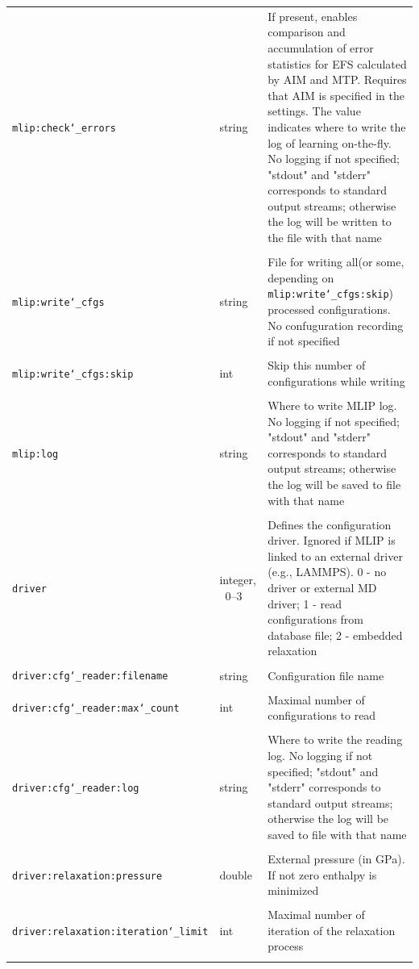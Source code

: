 \documentclass[12pt]{article}
\renewcommand{\_}{\char`_}
\begin{document}
{\begin{longtable}{| p{\largestoption} | p{3.5em} | p{\descriptionlength} |}
		\texttt{mlip:check\_errors}	& string &	If present, enables comparison and accumulation of error statistics for EFS calculated by AIM and MTP. Requires that AIM is specified in the settings. The value indicates where to write the log of learning on-the-fly. No logging if not specified; "stdout" and "stderr" corresponds to standard output streams; otherwise the log will be written to the file with that name \\
&&\\
		\texttt{mlip:write\_cfgs}& string &	File for writing all(or some, depending on \texttt{mlip:write\_cfgs:skip}) processed configurations. No confuguration recording if not specified\\
&&\\
		\texttt{mlip:write\_cfgs:skip}& int &		Skip this number of configurations while writing\\
&&\\
		\texttt{mlip:log}	&string&	Where to write MLIP log. No logging if not specified; "stdout" and "stderr" corresponds to standard output streams; otherwise the log will be saved to file with that name\\
		\hline
&&\\
		\texttt{driver}	& integer, ~0--3 &		Defines the configuration driver. Ignored if MLIP is linked to an external driver (e.g., LAMMPS). 0 - no driver or external MD driver; 1 - read configurations from database file; 2 - embedded relaxation\\
&&\\
		\texttt{driver:cfg\_reader:filename}&string&	Configuration file name\\ 
&&\\
		\texttt{driver:cfg\_reader:max\_count}	&int&		Maximal number of configurations to read\\
&&\\
		\texttt{driver:cfg\_reader:log}&string&	Where to write the reading log. No logging if not specified; "stdout" and "stderr" corresponds to standard output streams; otherwise the log will be saved to file with that name\\
&&\\
		\texttt{driver:relaxation:pressure}	&double&	External pressure (in GPa). If not zero enthalpy is minimized\\
&&\\
		\texttt{driver:relaxation:iteration\_limit}	&int&		Maximal number of iteration of the relaxation process\\
&&\\

\end{longtable}}
\end{document}
